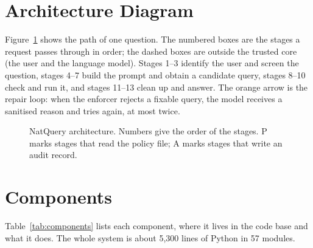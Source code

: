 \section{Architecture Diagram}

Figure~\ref{fig:arch} shows the path of one question. The numbered boxes are the stages a request passes
through in order; the dashed boxes are outside the trusted core (the user and the language model).
Stages 1--3 identify the user and screen the question, stages 4--7 build the prompt and obtain a
candidate query, stages 8--10 check and run it, and stages 11--13 clean up and answer. The orange arrow
is the repair loop: when the enforcer rejects a fixable query, the model receives a sanitised reason and
tries again, at most twice.

\begin{figure}[htbp]
\centering
\resizebox{\textwidth}{!}{}
\caption{NatQuery architecture. Numbers give the order of the stages. P marks stages that read the
policy file; A marks stages that write an audit record.}
\label{fig:arch}
\end{figure}

\section{Components}

Table~\ref{tab:components} lists each component, where it lives in the code base and what it does. The
whole system is about 5,300 lines of Python in 57 modules.

